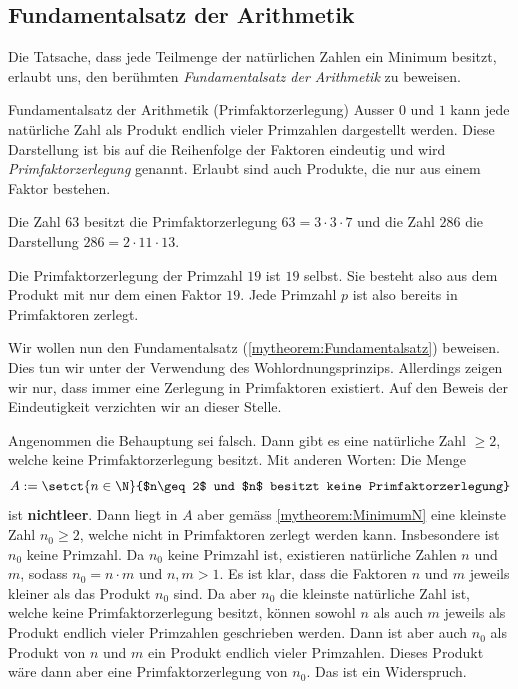 \subsection{Fundamentalsatz der Arithmetik}\label{subsec:fundamental}
Die Tatsache, dass jede Teilmenge der natürlichen Zahlen ein Minimum besitzt, erlaubt uns, den berühmten \textit{Fundamentalsatz der Arithmetik} zu beweisen.
\begin{mytheorem}{Fundamentalsatz der Arithmetik (Primfaktorzerlegung)}\label{mytheorem:Fundamentalsatz}
	Ausser $0$ und $1$ kann jede natürliche Zahl als Produkt endlich vieler Primzahlen dargestellt werden. Diese Darstellung ist bis auf die Reihenfolge der Faktoren eindeutig und wird \textit{Primfaktorzerlegung} genannt. Erlaubt sind auch Produkte, die nur aus einem Faktor bestehen.
\end{mytheorem}
\begin{myexample}
\begin{aenum}
	\item Die Zahl $63$ besitzt die Primfaktorzerlegung $63 = 3\cdot 3\cdot 7$ und die Zahl $286$ die Darstellung $286 = 2\cdot 11\cdot 13$.
	\item Die Primfaktorzerlegung der Primzahl $19$ ist $19$ selbst.
	Sie besteht also aus dem Produkt mit nur dem einen Faktor $19$.
	Jede Primzahl $p$ ist also bereits in Primfaktoren zerlegt.
\end{aenum}
\end{myexample}

\begin{myproof}
	Wir wollen nun den Fundamentalsatz (\cref{mytheorem:Fundamentalsatz}) beweisen. Dies tun wir unter der Verwendung des Wohlordnungsprinzips. Allerdings zeigen wir nur, dass immer eine Zerlegung in Primfaktoren existiert. Auf den Beweis der Eindeutigkeit verzichten wir an dieser Stelle.

	Angenommen die Behauptung sei falsch. Dann gibt es eine natürliche Zahl $\geq 2$, welche keine Primfaktorzerlegung besitzt. Mit anderen Worten: Die Menge
	\begin{align*}
		A := \setct{n\in\N}{$n\geq 2$ und $n$ besitzt keine Primfaktorzerlegung}
	\end{align*}
	ist \textbf{nichtleer}. Dann liegt in $A$ aber gemäss \cref{mytheorem:MinimumN} eine kleinste Zahl $n_0\geq 2$, welche nicht in Primfaktoren zerlegt werden kann. Insbesondere ist $n_0$ keine Primzahl. Da $n_0$ keine Primzahl ist, existieren natürliche Zahlen $n$ und $m$, sodass $n_0=n\cdot m$ und $n,m>1$. Es ist klar, dass die Faktoren $n$ und $m$ jeweils kleiner als das Produkt $n_0$ sind. Da aber $n_0$ die kleinste natürliche Zahl ist, welche keine Primfaktorzerlegung besitzt, können sowohl $n$ als auch $m$ jeweils als Produkt endlich vieler Primzahlen geschrieben werden. Dann ist aber auch $n_0$ als Produkt von $n$ und $m$ ein Produkt endlich vieler Primzahlen. Dieses Produkt wäre dann aber eine Primfaktorzerlegung von $n_0$. Das ist ein Widerspruch.
\end{myproof}

